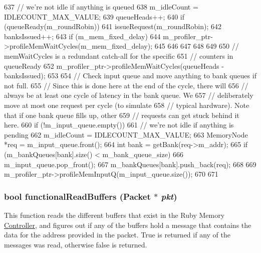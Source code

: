 \begin{DoxyCode}
{{{637             // we're not idle if anything is queued
638             m_idleCount = IDLECOUNT_MAX_VALUE;
639             queueHeads++;
640             if (queueReady(m_roundRobin)) {
641                 issueRequest(m_roundRobin);
642                 banksIssued++;
643                 if (m_mem_fixed_delay) {
644                     m_profiler_ptr->profileMemWaitCycles(m_mem_fixed_delay);
645                 }
646             }
647         }
648     }
649 
650     // memWaitCycles is a redundant catch-all for the specific
651     // counters in queueReady
652     m_profiler_ptr->profileMemWaitCycles(queueHeads - banksIssued);
653 
654     // Check input queue and move anything to bank queues if not full.
655     // Since this is done here at the end of the cycle, there will
656     // always be at least one cycle of latency in the bank queue.  We
657     // deliberately move at most one request per cycle (to simulate
658     // typical hardware).  Note that if one bank queue fills up, other
659     // requests can get stuck behind it here.
660     if (!m_input_queue.empty()) {
661         // we're not idle if anything is pending
662         m_idleCount = IDLECOUNT_MAX_VALUE;
663         MemoryNode *req = m_input_queue.front();
664         int bank = getBank(req->m_addr);
665         if (m_bankQueues[bank].size() < m_bank_queue_size) {
666             m_input_queue.pop_front();
667             m_bankQueues[bank].push_back(req);
668         }
669         m_profiler_ptr->profileMemInputQ(m_input_queue.size());
670     }
671 }
\end{DoxyCode}
\hypertarget{classRubyMemoryControl_a898941f27bcf3a1c0383de5988406650}{
\subsubsection[{functionalReadBuffers}]{\setlength{\rightskip}{0pt plus 5cm}bool functionalReadBuffers ({\bf Packet} $\ast$ {\em pkt})}}
\label{classRubyMemoryControl_a898941f27bcf3a1c0383de5988406650}
This function reads the different buffers that exist in the Ruby Memory \hyperlink{namespaceController}{Controller}, and figures out if any of the buffers hold a message that contains the data for the address provided in the packet. True is returned if any of the messages was read, otherwise false is returned.

